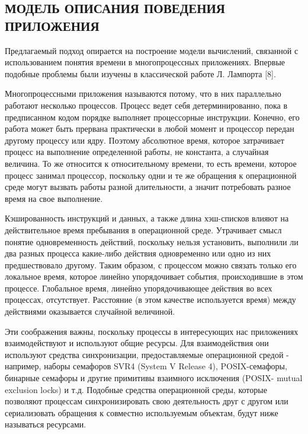 \begin{multicols}{2}
\section{МОДЕЛЬ ОПИСАНИЯ ПОВЕДЕНИЯ ПРИЛОЖЕНИЯ}

Предлагаемый подход опирается на построение модели вычислений, связанной с использованием понятия времени в многопроцессных приложениях. Впервые подобные проблемы были изучены в классической работе Л. Лампорта [8].

Многопроцессными приложения называются потому, что в них параллельно работают несколько процессов. Процесс ведет себя детерминированно, пока в предписанном кодом порядке выполняет процессорные инструкции. Конечно, его работа может быть прервана практически в любой момент и процессор передан другому процессу или ядру. Поэтому абсолютное время, которое затрачивает процесс на выполнение определенной работы, не  константа, а случайная  величина. То же  относится к относительному времени, то есть времени, которое процесс занимал процессор,  поскольку одни и те же обращения к операционной среде могут вызвать работы разной длительности, а значит потребовать разное время на свое выполнение.

Кэшированность инструкций и данных, а также длина хэш-списков влияют на действительное время пребывания в операционной среде. Утрачивает смысл понятие одновременность действий, поскольку  нельзя установить, выполнили ли два разных процесса какие-либо действия одновременно или одно из них предшествовало другому. Таким образом, с процессом можно связать только его локальное время, которое линейно упорядочивает события,  происходившие в этом процессе.  Глобальное время, линейно упорядочивающее действия во всех процессах, отсутствует. Расстояние (в этом качестве используется время) между действиями оказывается случайной величиной.

Эти соображения важны, поскольку процессы в интересующих нас приложениях взаимодействуют и используют общие ресурсы. Для взаимодействия они используют средства синхронизации, предоставляемые операционной средой - например, наборы семафоров SVR4 (System V Release 4), POSIX-семафоры, бинарные семафоры и другие примитивы взаимного исключения (POSIX- mutual exclusion locks) и т.д. Подобные средства операционной среды, которые позволяют процессам синхронизировать свою деятельность друг с другом или сериализовать обращения к совместно используемым объектам,  будут ниже  называться ресурсами.


\end{multicols}
